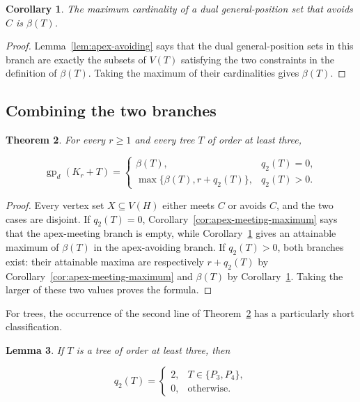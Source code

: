 \documentclass[11pt,a4paper]{article}
\newtheorem{theorem}{Theorem}[section]
\newtheorem{lemma}[theorem]{Lemma}
\newtheorem{corollary}[theorem]{Corollary}
\numberwithin{equation}{section}
\begin{document}
\begin{corollary}\label{cor:apex-avoiding-maximum}
The maximum cardinality of a dual
general-position set that avoids \(C\) is \(\beta(T)\).
\end{corollary}

\begin{proof}
Lemma~\ref{lem:apex-avoiding} says that the dual general-position sets in
this branch are exactly the subsets of \(V(T)\) satisfying the two
constraints in the definition of \(\beta(T)\). Taking the maximum of
their cardinalities gives \(\beta(T)\).
\end{proof}

\subsection{Combining the two branches}\label{sec:combining}

\begin{theorem}\label{thm:two-branch}
For every \(r\ge 1\) and every tree \(T\) of order
at least three,

\[
\operatorname{gp}_d(K_r+T)=
\begin{cases}
\beta(T),&q_2(T)=0,\\
\max\{\beta(T),r+q_2(T)\},&q_2(T)>0.
\end{cases}
\]
\end{theorem}

\begin{proof}
Every vertex set \(X\subseteq V(H)\) either meets \(C\)
or avoids \(C\), and the two cases are disjoint. If \(q_2(T)=0\),
Corollary~\ref{cor:apex-meeting-maximum} says that the apex-meeting branch is empty, while
Corollary~\ref{cor:apex-avoiding-maximum} gives an attainable maximum of \(\beta(T)\) in the
apex-avoiding branch. If \(q_2(T)>0\), both branches exist: their
attainable maxima are respectively \(r+q_2(T)\) by Corollary~\ref{cor:apex-meeting-maximum} and
\(\beta(T)\) by Corollary~\ref{cor:apex-avoiding-maximum}. Taking the larger of these two values
proves the formula.
\end{proof}

For trees, the occurrence of the second line of Theorem~\ref{thm:two-branch} has a
particularly short classification.

\begin{lemma}\label{lem:q2-trees}
If \(T\) is a tree of order at least three, then

\[
q_2(T)=
\begin{cases}
2,&T\in\{P_3,P_4\},\\
0,&\text{otherwise}.
\end{cases}
\]
\end{lemma}
\end{document}
